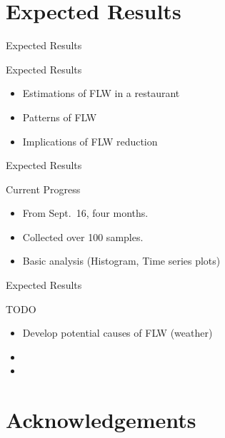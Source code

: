 \documentclass[
  ignorenonframetext,
]{beamer}
\providecommand{\tightlist}{%
  \setlength{\itemsep}{0pt}\setlength{\parskip}{0pt}}
\begin{document}
\hypertarget{expected-results}{%
\section{Expected Results}\label{expected-results}}

\begin{frame}{Expected Results}
\protect\hypertarget{expected-results-1}{}
\begin{block}{Expected Results}
\protect\hypertarget{expected-results-2}{}
\begin{itemize}
\tightlist
\item
  Estimations of FLW in a restaurant
\item
  Patterns of FLW
\item
  Implications of FLW reduction
\end{itemize}
\end{block}
\end{frame}

\begin{frame}{Expected Results}
\protect\hypertarget{expected-results-3}{}
\begin{block}{Current Progress}
\protect\hypertarget{current-progress}{}
\begin{itemize}
\tightlist
\item
  From Sept.~16, four months.
\item
  Collected over 100 samples.
\item
  Basic analysis (Histogram, Time series plots)
\end{itemize}
\end{block}
\end{frame}

\begin{frame}{Expected Results}
\protect\hypertarget{expected-results-4}{}
\begin{block}{TODO}
\protect\hypertarget{todo}{}
\begin{itemize}
\tightlist
\item
  Develop potential causes of FLW (weather)
\item
\item
\end{itemize}
\end{block}
\end{frame}

\hypertarget{acknowledgements}{%
\section{Acknowledgements}\label{acknowledgements}}
\end{document}

